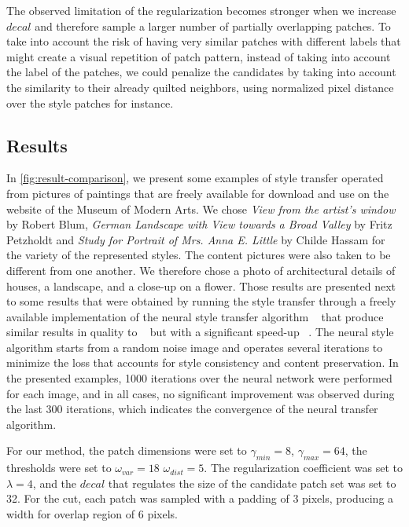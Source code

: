 \documentclass[a4paper]{article}
\begin{document}
The observed limitation of the regularization becomes stronger when we increase $decal$ and therefore sample a larger number of partially overlapping patches. To take into account the risk of having very similar patches with different labels that might create a visual repetition of patch pattern, instead of taking into account the label of the patches, we could penalize the candidates by taking into account the similarity to their already quilted neighbors, using normalized pixel distance over the style patches for instance.



\subsection{Results}

In \ref{fig:result-comparison}, we present some examples of style transfer operated from pictures of paintings that are freely available for download and use on the website of the Museum of Modern Arts. We chose \textit{View from the artist's window} by Robert Blum, \textit{German Landscape with View towards a Broad Valley} by Fritz Petzholdt and \textit{Study for Portrait of Mrs. Anna E. Little} by Childe Hassam for the variety of the represented styles. The content pictures were also taken to be different from one another. We therefore chose a photo of architectural details of houses, a landscape, and a close-up on a flower.
Those results are presented next to some results that were obtained by running the style transfer through a freely available implementation of the neural style transfer algorithm ~\cite{Johnson2015} that produce similar results in quality to ~\cite{neuralstyle} but with a significant speed-up ~\cite{Johnson2016Perceptual}. The neural style algorithm starts from a random noise image and operates several iterations to minimize the loss that accounts for style consistency and content preservation. In the presented examples, 1000 iterations over the neural network were performed for each image, and in all cases, no significant improvement was observed during the last 300 iterations, which indicates the convergence of the neural transfer algorithm. 

For our method, the patch dimensions were set to $\gamma_{min}=8$, $\gamma_{max}= 64$, the thresholds were set to $\omega_{var} = 18$ $\omega_{dist}=5$. The regularization coefficient was set to $\lambda = 4$, and the $decal$ that regulates the size of the candidate patch set was set to 32. For the cut, each patch was sampled with a padding of 3 pixels, producing a width for overlap region of 6 pixels.
\end{document}
